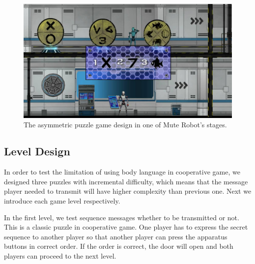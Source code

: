 \begin{figure}[!h]
\centering
\includegraphics[width=0.9\columnwidth]{Figures/GD_F2.jpg}
\caption{The asymmetric puzzle game design in one of Mute Robot’s stages.}
\label{fig:GD_F2}
\end{figure}


\subsection{Level Design}


In order to test the limitation of using body language in cooperative game, we designed three puzzles with incremental difficulty, which means that the message player needed to transmit will have higher complexity than previous one. Next we introduce each game level respectively.


In the first level, we test sequence messages whether to be transmitted or not. This is a classic puzzle in cooperative game. One player has to express the secret sequence to another player so that another player can press the apparatus buttons in correct order. If the order is correct, the door will open and both players can proceed to the next level.



